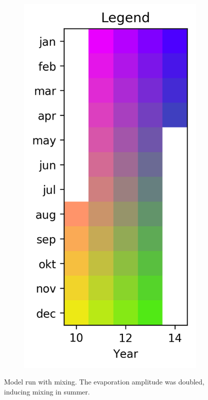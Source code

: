 \documentclass[twocolumn]{article}
\begin{document}
\begin{figure}
\begin{subfigure}[h]{0.20\textwidth}
\includegraphics[width=1.0\textwidth,keepaspectratio]{summer_mixing_Legend.png}
\end{subfigure}\hfill
\caption{Model run with mixing. The evaporation amplitude was doubled, inducing mixing in summer.}
\label{fig:summer_mixing}
\end{figure}
\end{document}
